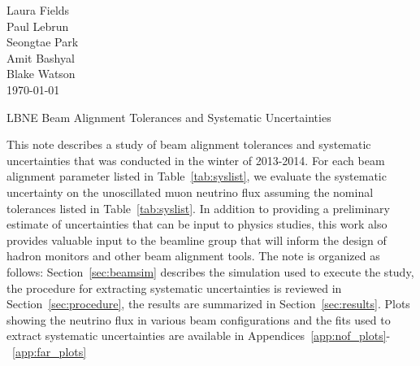 



\begin{flushright}
Laura Fields\\
Paul Lebrun \\
Seongtae Park \\
Amit Bashyal \\
Blake Watson \\
\today
\end{flushright}

\begin{center}

{\LARGE LBNE Beam Alignment Tolerances and Systematic Uncertainties}
\end{center}




This note describes a study of beam alignment tolerances and systematic uncertainties that was conducted in the winter of 2013-2014.  For each beam alignment parameter listed in Table~\ref{tab:syslist}, we evaluate the systematic uncertainty on the unoscillated muon neutrino flux assuming the nominal tolerances listed in Table~\ref{tab:syslist}.  In addition to providing a preliminary estimate of uncertainties that can be input to physics studies, this work also provides valuable input to the beamline group that will inform the design of hadron monitors and other beam alignment tools.  The note is organized as follows: Section~\ref{sec:beamsim} describes the simulation used to execute the study, the procedure for extracting systematic uncertainties is reviewed in Section~\ref{sec:procedure}, the results are summarized in Section~\ref{sec:results}.  Plots showing the neutrino flux in various beam configurations and the fits used to extract systematic uncertainties are available in Appendices~\ref{app:nof_plots}-~\ref{app:far_plots}


